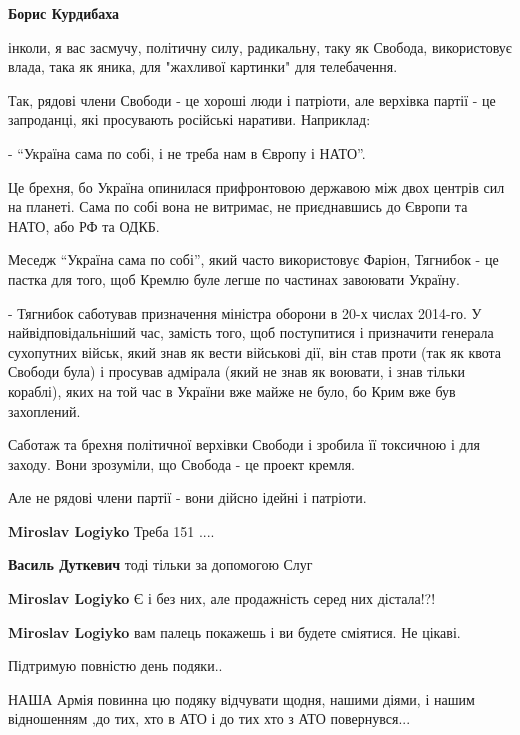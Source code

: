\begin{itemize}
\begin{itemize}
\begin{itemize}
\textbf{Борис Курдибаха} 

інколи, я вас засмучу, політичну силу, радикальну, таку як Свобода,
використовує влада, така як яника, для "жахливої картинки" для телебачення.

Так, рядові члени Свободи - це хороші люди і патріоти, але верхівка партії - це
запроданці, які просувають російські наративи. Наприклад:

- \enquote{Україна сама по собі, і не треба нам в Європу і НАТО}.

Це брехня, бо Україна опинилася прифронтовою державою між двох центрів сил на
планеті. Сама по собі вона не витримає, не приєднавшись до Європи та НАТО, або
РФ та ОДКБ.

Меседж \enquote{Україна сама по собі}, який часто використовує Фаріон, Тягнибок - це
пастка для того, щоб Кремлю буле легше по частинах завоювати Україну.

- Тягнибок саботував призначення міністра оборони в 20-х числах 2014-го. У
найвідповідальніший час, замість того, щоб поступитися і призначити генерала
сухопутних військ, який знав як вести військові дії, він став проти (так як
квота Свободи була) і просував адмірала (який не знав як воювати, і знав тільки
кораблі), яких на той час в України вже майже не було, бо Крим вже був
захоплений.

Саботаж та брехня політичної верхівки Свободи і зробила її токсичною і для
заходу. Вони зрозуміли, що Свобода - це проект кремля.

Але не рядові члени партії - вони дійсно ідейні і патріоти.

\end{itemize} %

\textbf{Miroslav Logiyko} Треба 151 ....

\textbf{Василь Дуткевич} тоді тільки за допомогою Слуг

\textbf{Miroslav Logiyko} Є і без них, але продажність серед них дістала!?!

\textbf{Miroslav Logiyko} вам палець покажешь і ви будете сміятися. Не цікаві.


\end{itemize} %


Підтримую повністю день подяки..

НАША Армія повинна цю подяку відчувати щодня, нашими діями, і нашим відношенням
,до тих, хто в АТО і до тих хто з АТО повернувся...


\end{itemize}
